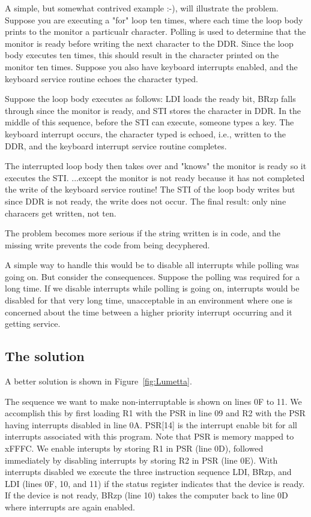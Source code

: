 \documentclass{patt}
\begin{document}
A simple, but somewhat contrived example :-), will illustrate the problem.  
Suppose you are executing a "for" loop ten times, where each time the loop 
body prints to the monitor a particualr character.  Polling is used to
determine that the monitor is ready before writing the next character to the 
DDR.
Since the loop body executes ten times, this should result in the character 
printed on the monitor ten times.  Suppose you also have keyboard interrupts 
enabled, and the keyboard service routine echoes the character typed.  

Suppose the loop body executes as follows: LDI loads the ready bit, BRzp 
falls through since the monitor is ready, and STI stores the character 
in DDR.  In the middle of this sequence, before the STI can execute, someone 
types a key.  The keyboard interrupt occurs, the character typed is echoed, 
i.e., written to the DDR, and the keyboard interrupt service routine completes.

The interrupted loop body then takes over and "knows" the monitor is ready so 
it executes the STI.  ...except the monitor is not ready because it has not 
completed the write of the keyboard service routine!  The STI of the loop 
body writes but since DDR is not ready, the write does not occur.  The final
result: only nine characers get written, not ten.

The problem becomes more serious if the string written is in code, and the
missing write prevents the code from being decyphered.

A simple way to handle this would be to disable all interrupts while
polling was going on.  But consider the consequences.  
Suppose the polling was required for a long time. If we disable 
interrupts while polling is going on, interrupts would be disabled for
that very long time, unacceptable in an environment where one is concerned
about the time between a higher priority interrupt occurring and it
getting service.

\subsection{The solution}

A better solution is shown in Figure~\ref{fig:Lumetta}.

The sequence we want to make non-interruptable is shown on lines 0F to 11.
We accomplish this by first loading R1 with the PSR in line 09 and R2 
with the PSR having interrupts disabled in line 0A.  PSR[14] is 
the interrupt enable 
bit for all interrupts associated with this program.  Note that PSR is 
memory mapped to xFFFC.  We enable interupts by storing R1 in PSR (line 0D),
followed immediately by disabling interrupts by storing R2 in PSR (line 0E).
With interrupts disabled we execute the three instruction sequence LDI,
BRzp, and LDI (lines 0F, 10, and 11) if the status register indicates that
the device is ready.  If the device is not ready, BRzp (line 10) takes the
computer back to line 0D where interrupts are again enabled.
\end{document}
